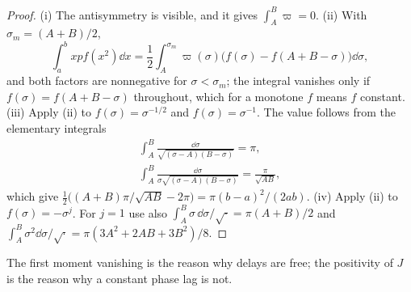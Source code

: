 \begin{proof}
(i) The antisymmetry is visible, and it gives $\int_A^B\varpi=0$.
(ii) With $\sigma_m=(A+B)/2$,
\[
\int_a^bxpf(x^2)\dd x=\frac12\int_A^{\sigma_m}\varpi(\sigma)
\big(f(\sigma)-f(A+B-\sigma)\big)\dd\sigma ,
\]
and both factors are nonnegative for $\sigma<\sigma_m$; the integral vanishes
only if $f(\sigma)=f(A+B-\sigma)$ throughout, which for a monotone $f$ means
$f$ constant.
(iii) Apply (ii) to $f(\sigma)=\sigma^{-1/2}$ and $f(\sigma)=\sigma^{-1}$. The
value follows from the elementary integrals
\begin{gather*}
\int_A^B\frac{\dd\sigma}{\sqrt{(\sigma-A)(B-\sigma)}}=\pi,\\
\int_A^B\frac{\dd\sigma}{\sigma\sqrt{(\sigma-A)(B-\sigma)}}=\frac{\pi}{\sqrt{AB}},
\end{gather*}
which give $\frac12\big((A+B)\pi/\sqrt{AB}-2\pi\big)=\pi(b-a)^2/(2ab)$.
(iv) Apply (ii) to $f(\sigma)=-\sigma^j$. For $j=1$ use also
$\int_A^B\sigma\,\dd\sigma/\sqrt{\cdot}=\pi(A+B)/2$ and
$\int_A^B\sigma^2\dd\sigma/\sqrt\cdot=\pi(3A^2+2AB+3B^2)/8$.
\end{proof}

The first moment vanishing is the reason why delays are free; the positivity
of $J$ is the reason why a constant phase lag is not.
